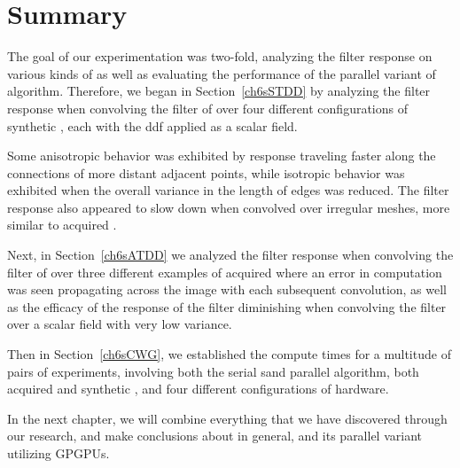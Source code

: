 %
%
%
%
%
%
\clearpage
\section{Summary}
The goal of our experimentation was two-fold, analyzing the filter response on various kinds of \tdd{} as well as evaluating the performance of the parallel variant of  algorithm. Therefore, we began in Section~\ref{ch6sSTDD} by analyzing the filter response when convolving the filter of over four different configurations of synthetic \tdd{}, each with the \gls{ddf} applied as a scalar field.

Some anisotropic behavior was exhibited by  response traveling faster along the connections of more distant adjacent points, while isotropic behavior was exhibited when the overall variance in the length of edges was reduced. The filter response also appeared to slow down when convolved over irregular meshes, more similar to acquired \tdd{}.

Next, in Section~\ref{ch6sATDD} we analyzed the filter response when convolving the filter of over three different examples of acquired \tdd{} where an error in computation was seen propagating across the image with each subsequent convolution, as well as the efficacy of the response of the filter diminishing when convolving the filter over a scalar field with very low variance.

Then in Section~\ref{ch6sCWG}, we established the compute times for a multitude of pairs of experiments, involving both the serial sand parallel algorithm, both acquired and synthetic \tdd{}, and four different configurations of hardware.

In the next chapter, we will combine everything that we have discovered through our research, and make conclusions about  in general, and its parallel variant utilizing \glspl{GPGPU}.

